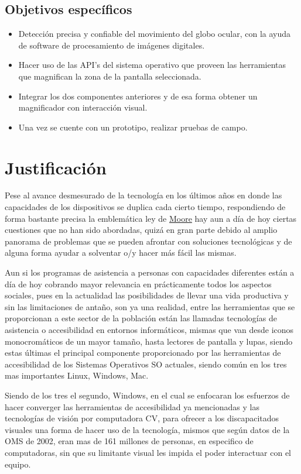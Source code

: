 \documentclass[12pt]{book} %
\begin{document}
	\subsection{Objetivos específicos}
		\begin{itemize}
			\item Detección precisa y confiable del movimiento del globo ocular, con la ayuda de software de 
			procesamiento de imágenes digitales.
			\item Hacer uso de las API’s del sistema operativo que proveen las herramientas que magnifican la zona de
			la pantalla seleccionada.
			\item Integrar los dos componentes anteriores y de esa forma obtener un magnificador con interacción visual.
			\item Una vez se cuente con un prototipo, realizar pruebas de campo.
		\end{itemize}
		

\newpage
\section{Justificación}
	Pese al avance desmesurado de la tecnología en los últimos años en donde las capacidades de los dispositivos se
	duplica cada cierto tiempo, respondiendo de forma bastante precisa la emblemática ley de 
	\href{https://en.wikipedia.org/wiki/Moore's_law}{Moore} hay aun a día de hoy
	ciertas cuestiones que no han sido abordadas, quizá en gran parte debido al amplio panorama de problemas que se
	pueden afrontar con soluciones tecnológicas y de alguna forma ayudar a solventar o/y hacer más fácil las mismas.
	
	Aun si los programas de asistencia a personas con capacidades diferentes están a día de hoy cobrando mayor 			  	
	relevancia en prácticamente todos los aspectos sociales, pues en la actualidad las posibilidades de llevar una vida
	productiva y sin las limitaciones de antaño, son ya una realidad, entre las herramientas que se proporcionan a este
	sector de la población están las llamadas tecnologías de asistencia o accesibilidad en entornos informáticos, mismas
	que van desde iconos monocromáticos de un mayor tamaño, hasta lectores de pantalla y lupas, siendo estas últimas el
	principal componente proporcionado por las herramientas de accesibilidad de los Sistemas Operativos \gls{SO} actuales,
	siendo común en los tres mas importantes \gls{Linux}, \gls{Windows}, \gls{Mac}.
	
	Siendo de los tres el segundo, Windows, en el cual se enfocaran los esfuerzos de hacer converger las herramientas de
	accesibilidad ya mencionadas y las tecnologías de visión por computadora CV, para ofrecer a los discapacitados 
	visuales una forma de hacer uso de la tecnología, mismos que según datos de la OMS de 2002, eran mas de 161 millones
	de personas, en especifico de computadoras, sin que su limitante visual les impida el poder interactuar con el 
	equipo.
	
\end{document}
